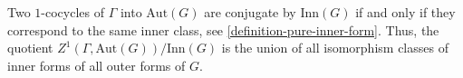 \begin{remark}
\label{remark-inner-classes}
Two $1$-cocycles of $\Gamma$ into $\text{Aut}(G)$ are conjugate by $\text{Inn}(G)$ if and only if they correspond to the same inner class, see \ref{definition-pure-inner-form}. Thus, the quotient $Z^1(\Gamma, \text{Aut}(G))/\text{Inn}(G)$ is the union of all isomorphism classes of inner forms of all outer forms of $G$. 
\end{remark}













